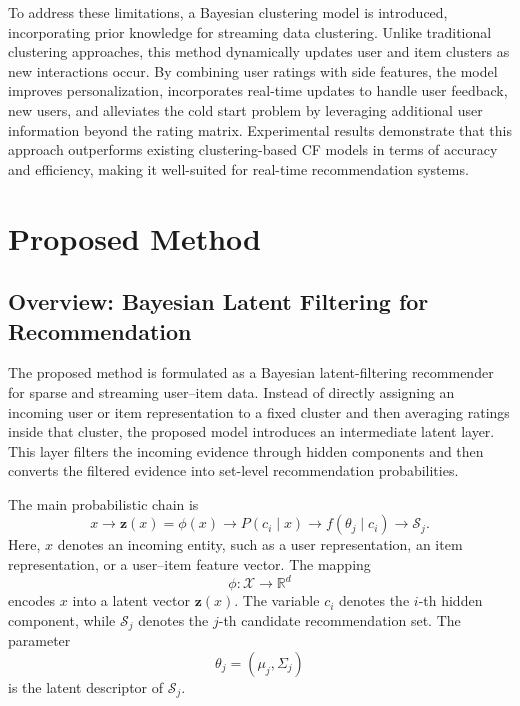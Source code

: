 \documentclass{article}
\theoremstyle{plain}
\theoremstyle{definition}
\theoremstyle{remark}
\begin{document}
To address these limitations, a Bayesian clustering model is introduced, incorporating prior knowledge for streaming data clustering. Unlike traditional clustering approaches, this method dynamically updates user and item clusters as new interactions occur. By combining user ratings with side features, the model improves personalization, incorporates real-time updates to handle user feedback, new users, and alleviates the cold start problem by leveraging additional user information beyond the rating matrix. Experimental results demonstrate that this approach outperforms existing clustering-based CF models in terms of accuracy and efficiency, making it well-suited for real-time recommendation systems. 











\section{Proposed Method}
\label{sec:proposed_method}

\subsection{Overview: Bayesian Latent Filtering for Recommendation}
\label{subsec:overview}

The proposed method is formulated as a Bayesian latent-filtering recommender for sparse and streaming user--item data. Instead of directly assigning an incoming user or item representation to a fixed cluster and then averaging ratings inside that cluster, the proposed model introduces an intermediate latent layer. This layer filters the incoming evidence through hidden components and then converts the filtered evidence into set-level recommendation probabilities.

The main probabilistic chain is
\[
x
\longrightarrow
\mathbf z(x)=\phi(x)
\longrightarrow
P(c_i\mid x)
\longrightarrow
f(\theta_j\mid c_i)
\longrightarrow
\mathcal S_j .
\]
Here, \(x\) denotes an incoming entity, such as a user representation, an item representation, or a user--item feature vector. The mapping
\[
\phi:\mathcal X\rightarrow\mathbb R^d
\]
encodes \(x\) into a latent vector \(\mathbf z(x)\). The variable \(c_i\) denotes the \(i\)-th hidden component, while \(\mathcal S_j\) denotes the \(j\)-th candidate recommendation set. The parameter
\[
\theta_j=(\mu_j,\Sigma_j)
\]
is the latent descriptor of \(\mathcal S_j\).
\end{document}
